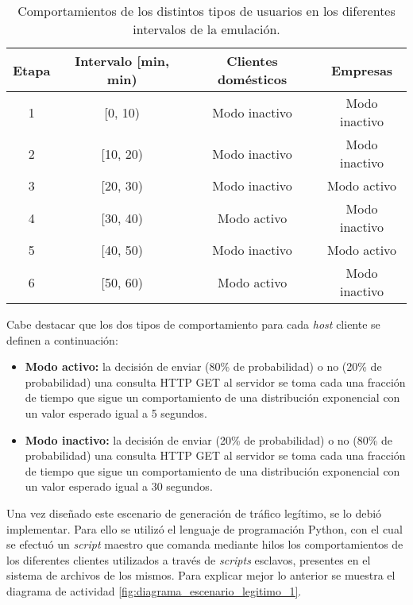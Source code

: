 \begin{table}[H]
	\centering
	\begin{tabular}{|c|c|c|c|}
		\hline
        \cellcolor[HTML]{EFEFEF}\textbf{Etapa} & \cellcolor[HTML]{EFEFEF}\textbf{Intervalo [min, min)} & \cellcolor[HTML]{EFEFEF}\textbf{Clientes domésticos} & \cellcolor[HTML]{EFEFEF}\textbf{Empresas}\\ \hline
        1 & [0, 10)  & Modo inactivo & Modo inactivo \\ \hline
        2 & [10, 20) & Modo inactivo & Modo inactivo \\ \hline
        3 & [20, 30) & Modo inactivo & Modo activo   \\ \hline
        4 & [30, 40) & Modo activo   & Modo inactivo \\ \hline
        5 & [40, 50) & Modo inactivo & Modo activo   \\ \hline
        6 & [50, 60) & Modo activo   & Modo inactivo \\ \hline
						
	\end{tabular}
	\caption{Comportamientos de los distintos tipos de usuarios 
en los diferentes intervalos de la emulación.}
	\label{tab:comportamientos}
\end{table}

Cabe destacar que los dos tipos de comportamiento para cada \textit{host}
cliente se definen a continuación:

\begin{itemize}
\item{\textbf{Modo activo:}} la decisión de enviar (80\% de probabilidad) o no
  (20\% de probabilidad) una consulta HTTP GET al servidor se toma cada una
  fracción de tiempo que sigue un comportamiento de una distribución exponencial
  con un valor esperado igual a 5 segundos.
\item{\textbf{Modo inactivo:}} la decisión de enviar (20\% de probabilidad) o no
  (80\% de probabilidad) una consulta HTTP GET al servidor se toma cada una
  fracción de tiempo que sigue un comportamiento de una distribución exponencial
  con un valor esperado igual a 30 segundos.
\end{itemize}


Una vez diseñado este escenario de generación de tráfico legítimo, se lo debió
implementar. Para ello se utilizó el lenguaje de programación Python, con el
cual se efectuó un \textit{script} maestro que comanda mediante hilos los comportamientos
de los diferentes clientes utilizados a través de \textit{scripts} esclavos, presentes en
el sistema de archivos de los mismos. Para explicar mejor lo anterior se muestra
el diagrama de actividad \ref{fig:diagrama_escenario_legitimo_1}. \\

